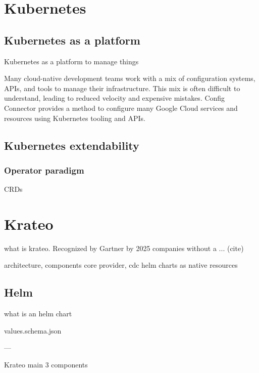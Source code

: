 \section{Kubernetes}


\subsection{Kubernetes as a platform}
Kubernetes as a platform to manage things


Many cloud-native development teams work with a mix of configuration systems, APIs, and tools to manage their infrastructure. This mix is often difficult to understand, leading to reduced velocity and expensive mistakes. Config Connector provides a method to configure many Google Cloud services and resources using Kubernetes tooling and APIs.


\subsection{Kubernetes extendability}

\subsubsection{Operator paradigm}

CRDs

\section{Krateo}
\label{sec:krateo}

what is krateo. Recognized by Gartner
by 2025 companies without a ... (cite)

architecture, components
core provider, cdc
helm charts as native resources


\subsection{Helm}
what is an helm chart

values.schema.json

---


Krateo main 3 components


